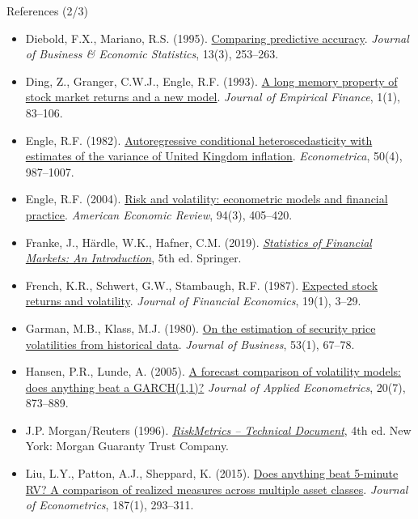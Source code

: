 \begin{frame}{References (2/3)}
\itemsize{\tiny}
\begin{itemize}
    \item Diebold, F.X., Mariano, R.S. (1995). \href{https://doi.org/10.1080/07350015.1995.10524599}{Comparing predictive accuracy}. \textit{Journal of Business \& Economic Statistics}, 13(3), 253--263.
    \item Ding, Z., Granger, C.W.J., Engle, R.F. (1993). \href{https://doi.org/10.1016/0927-5398(93)90006-D}{A long memory property of stock market returns and a new model}. \textit{Journal of Empirical Finance}, 1(1), 83--106.
    \item Engle, R.F. (1982). \href{https://doi.org/10.2307/1912773}{Autoregressive conditional heteroscedasticity with estimates of the variance of United Kingdom inflation}. \textit{Econometrica}, 50(4), 987--1007.
    \item Engle, R.F. (2004). \href{https://doi.org/10.1257/0002828041464597}{Risk and volatility: econometric models and financial practice}. \textit{American Economic Review}, 94(3), 405--420.
    \item Franke, J., Härdle, W.K., Hafner, C.M. (2019). \href{https://doi.org/10.1007/978-3-030-13751-9}{\textit{Statistics of Financial Markets: An Introduction}}, 5th ed. Springer.
    \item French, K.R., Schwert, G.W., Stambaugh, R.F. (1987). \href{https://doi.org/10.1016/0304-405X(87)90026-2}{Expected stock returns and volatility}. \textit{Journal of Financial Economics}, 19(1), 3--29.
    \item Garman, M.B., Klass, M.J. (1980). \href{https://doi.org/10.1086/296072}{On the estimation of security price volatilities from historical data}. \textit{Journal of Business}, 53(1), 67--78.
    \item Hansen, P.R., Lunde, A. (2005). \href{https://doi.org/10.1002/jae.800}{A forecast comparison of volatility models: does anything beat a GARCH(1,1)?} \textit{Journal of Applied Econometrics}, 20(7), 873--889.
    \item J.P. Morgan/Reuters (1996). \href{https://www.msci.com/documents/10199/5915b101-4206-4ba0-aee2-3449d5c7e95a}{\textit{RiskMetrics -- Technical Document}}, 4th ed. New York: Morgan Guaranty Trust Company.
    \item Liu, L.Y., Patton, A.J., Sheppard, K. (2015). \href{https://doi.org/10.1016/j.jeconom.2015.02.008}{Does anything beat 5-minute RV? A comparison of realized measures across multiple asset classes}. \textit{Journal of Econometrics}, 187(1), 293--311.

\end{itemize}
\end{frame}
